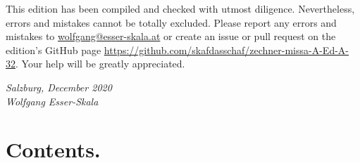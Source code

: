 \documentclass[parskip=full]{scrreprt}
\newif\iftemplate\templatetrue
\begin{document}
This edition has been compiled and checked with utmost diligence. Nevertheless, errors and mistakes cannot be totally excluded. Please report any errors and mistakes to \url{wolfgang@esser-skala.at} or create an issue or pull request on the edition’s GitHub page \url{https://github.com/skafdasschaf/zechner-missa-A-Ed-A-32}. Your help will be greatly appreciated.

\bigskip
\textit{Salzburg, December 2020\\
Wolfgang Esser-Skala}

\cleardoublepage
\chapter*{Contents.}


\cleardoublepage
\fi

\iftemplate

\fi
\end{document}
